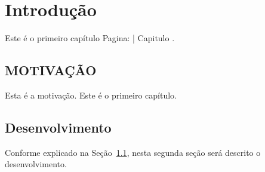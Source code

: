 \chapter{\thechapter \hspace{3mm} Introdu\c{c}\~ao} \label{cap:introduction}

Este \'e o primeiro cap\'itulo Pagina: | Capitulo \thechapter. 

\section{MOTIVA\c{C}\~AO}\label{sec:motivation}

Esta \'e a motiva\c{c}\~ao. 
Este \'e o primeiro cap\'itulo. 
 


\section{Desenvolvimento}\label{sec:desenv}

Conforme explicado na Se\c{c}\~ao~\ref{sec:motivation}, nesta segunda se\c{c}\~ao ser\'a descrito o desenvolvimento.